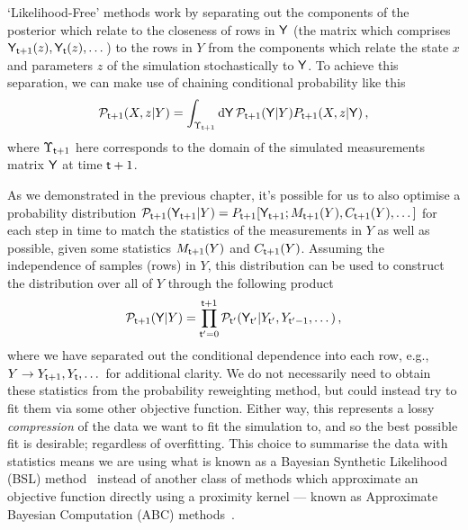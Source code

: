 `Likelihood-Free' methods work by separating out the components of the posterior which relate to the closeness of rows in ${\sf Y}$ (the matrix which comprises ${\sf Y}_{{\sf t}+1}(z), {\sf Y}_{{\sf t}}(z), \dots$) to the rows in $Y$ from the components which relate the state $x$ and parameters $z$ of the simulation stochastically to ${\sf Y}$. To achieve this separation, we can make use of chaining conditional probability like this
\begin{align}
{\cal P}_{{\sf t}+1}(X,z\vert Y)=\int_{\Upsilon_{{\sf t}+1}} {\rm d}{\sf Y} \, {\cal P}_{{\sf t}+1}({\sf Y}\vert Y) P_{{\sf t}+1}(X,z \vert {\sf Y}) \label{eq:likelihood-free-posterior} \,,
\end{align}
where $\Upsilon_{{\sf t}+1}$ here corresponds to the domain of the simulated measurements matrix ${\sf Y}$ at time ${\sf t}+1$.

As we demonstrated in the previous chapter, it's possible for us to also optimise a probability distribution ${\cal P}_{{\sf t}+1}({\sf Y}_{{\sf t}+1}\vert Y) = P_{{\sf t}+1}[{\sf Y}_{{\sf t}+1};M_{{\sf t}+1}(Y),C_{{\sf t}+1}(Y),\dots ]$ for each step in time to match the statistics of the measurements in $Y$ as well as possible, given some statistics $M_{{\sf t}+1}(Y)$ and $C_{{\sf t}+1}(Y)$. Assuming the independence of samples (rows) in $Y$, this distribution can be used to construct the distribution over all of $Y$ through the following product
\begin{align}
{\cal P}_{{\sf t}+1}({\sf Y}\vert Y) = \prod_{{\sf t}'=0}^{{\sf t}+1}{\cal P}_{{\sf t}'}({\sf Y}_{{\sf t}'}\vert Y_{{\sf t}'}, Y_{{\sf t}'-1}, \dots) \,,
\end{align}
where we have separated out the conditional dependence into each row, e.g., $Y \rightarrow Y_{{\sf t}+1}, Y_{{\sf t}}, \dots$ for additional clarity. We do not necessarily need to obtain these statistics from the probability reweighting method, but could instead try to fit them via some other objective function. Either way, this represents a lossy \emph{compression} of the data we want to fit the simulation to, and so the best possible fit is desirable; regardless of overfitting. This choice to summarise the data with statistics means we are using what is known as a Bayesian Synthetic Likelihood (BSL) method~\cite{price2018bayesian,wood2010statistical} instead of another class of methods which approximate an objective function directly using a proximity kernel --- known as Approximate Bayesian Computation (ABC) methods~\cite{sisson2018handbook}.

